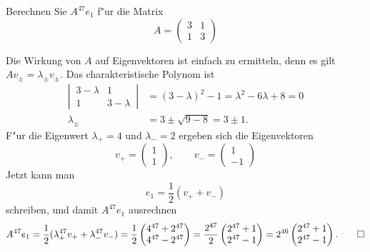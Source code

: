 Berechnen Sie $A^{47}e_1$ f"ur die Matrix
\[
A=\begin{pmatrix}
3&1\\
1&3
\end{pmatrix}
\]

\begin{loesung}
Die Wirkung von $A$ auf Eigenvektoren ist einfach zu ermitteln,
denn es gilt $Av_{\pm}=\lambda_{\pm}v_{\pm}$.
Das charakteristische Polynom ist
\begin{align*}
\left|\,\begin{matrix}3-\lambda&1\\1&3-\lambda\end{matrix}\,\right|
&=
(3-\lambda)^2-1=\lambda^2-6\lambda+8=0
\\
\lambda_{\pm}&=3\pm\sqrt{9-8}=3\pm1.
\end{align*}
F"ur die Eigenwert $\lambda_+=4$ und $\lambda_-=2$ ergeben sich die
Eigenvektoren
\[
v_+=\begin{pmatrix}1\\1\end{pmatrix},\qquad
v_-=\begin{pmatrix}1\\-1\end{pmatrix}
\]
Jetzt kann man
\[
e_1=\frac12(v_++v_-)
\]
schreiben, und damit $A^{47}e_1$ ausrechnen
\[
A^{47}e_1=\frac12( \lambda_+^{47}v_++\lambda_-^{47}v_-)
=\frac12\begin{pmatrix}
4^{47}+2^{47}\\
4^{47}-2^{47}
\end{pmatrix}
=\frac{2^{47}}2\begin{pmatrix}
2^{47}+1\\
2^{47}-1
\end{pmatrix}
=2^{46}\begin{pmatrix}
2^{47}+1\\
2^{47}-1
\end{pmatrix}.
\qedhere
\]
\end{loesung}

